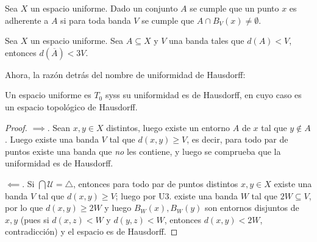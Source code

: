 \documentclass[topologia-analisis.tex]{subfiles}
\begin{document}
\begin{prop}
	Sea $X$ un espacio uniforme.
	Dado un conjunto $A$ se cumple que un punto $x$ es adherente a $A$ si para toda banda $V$ se cumple que $A \cap B_V(x) \ne \emptyset$.
\end{prop}
\begin{cor}
	Sea $X$ un espacio uniforme.
	Sea $A \subseteq X$ y $V$ una banda tales que $d(A) < V$, entonces $d( \overline A ) < 3V$.
\end{cor}

Ahora, la razón detrás del nombre de uniformidad de Hausdorff:
\begin{thm}
	Un espacio uniforme es $T_0$ syss su uniformidad es de Hausdorff, en cuyo caso es un espacio topológico de Hausdorff.
\end{thm}
\begin{proof}
	$\implies$. Sean $x, y \in X$ distintos, luego existe un entorno $A$ de $x$ tal que $y \notin A$.
	Luego existe una banda $V$ tal que $d(x, y) \ge V$, es decir, para todo par de puntos existe una banda que \textit{no} les contiene, y luego se comprueba
	que la uniformidad es de Hausdorff.
	\par
	$\impliedby$. Si $\bigcap \mathcal{U} = \triangle$, entonces para todo par de puntos distintos $x, y \in X$ existe una banda $V$ tal que
	$d(x, y) \ge V$; luego por U3. existe una banda $W$ tal que $2W \subseteq V$, por lo que $d(x, y) \ge 2W$ y luego $B_W(x), B_W(y)$ son entornos disjuntos
	de $x, y$ (pues si $d(x, z) < W$ y $d(y, z) < W$, entonces $d(x, y) < 2W$, contradicción) y el espacio es de Hausdorff.
\end{proof}
\end{document}
